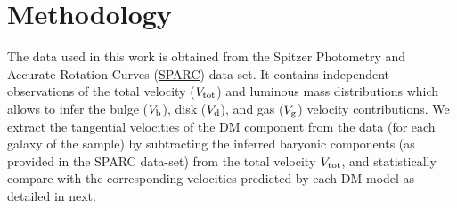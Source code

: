 \section{Methodology}
\label{sec:fitting}

The data used in this work is obtained from the Spitzer Photometry and Accurate Rotation Curves (\href{http://astroweb.cwru.edu/SPARC/}{SPARC}) data-set. It contains independent observations of the total velocity ($V_{\rm tot}$) and luminous mass distributions which allows to infer the bulge ($V_{\rm b}$), disk ($V_{\rm d}$), and gas ($V_{\rm g}$) velocity contributions. We extract the tangential velocities of the DM component from the data (for each galaxy of the sample) by subtracting the inferred baryonic components (as provided in the SPARC data-set) from the total velocity $V_{\rm tot}$, and statistically compare with the corresponding velocities predicted by each DM model as detailed in next. %




